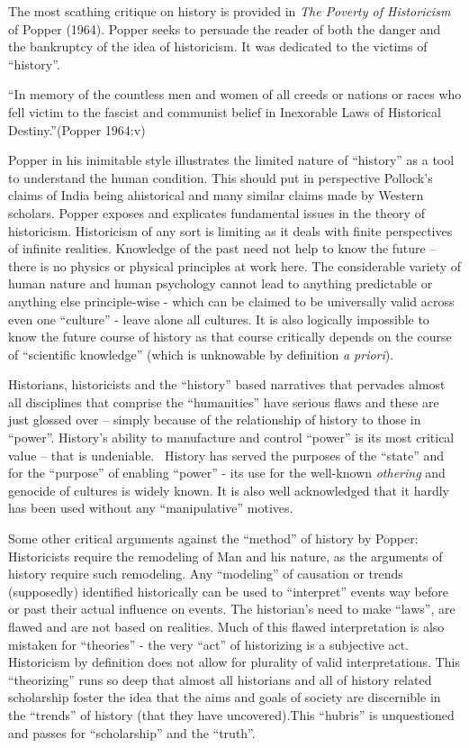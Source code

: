 The most scathing critique on history is provided in \textit{The Poverty of Historicism} of Popper (1964). Popper seeks to persuade the reader of both the danger and the bankruptcy of the idea of historicism. It was dedicated to the victims of “history”.

\begin{myquote}
“In memory of the countless men and women of all creeds or nations or races who fell victim to the fascist and communist belief in Inexorable Laws of Historical Destiny.”\hfill (Popper 1964:v)
\end{myquote}

Popper in his inimitable style illustrates the limited nature of “history” as a tool to understand the human condition. This should put in perspective Pollock’s claims of India being ahistorical and many similar claims made by Western scholars. Popper exposes and explicates fundamental issues in the theory of historicism. Historicism of any sort is limiting as it deals with finite perspectives of infinite realities. Knowledge of the past need not help to know the future – there is no physics or physical principles at work here. The considerable variety of human nature and human psychology cannot lead to anything predictable or anything else principle-wise - which can be claimed to be universally valid across even one “culture” - leave alone all cultures. It is also logically impossible to know the future course of history as that course critically depends on the course of “scientific knowledge” (which is unknowable by definition \textit{a priori}).

Historians, historicists and the “history” based narratives that pervades almost all disciplines that comprise the “humanities” have serious flaws and these are just glossed over – simply because of the relationship of history to those in “power”. History’s ability to manufacture and control “power” is its most critical value – that is undeniable.  History has served the purposes of the “state” and for the “purpose” of enabling “power” - its use for the well-known \textit{othering} and genocide of cultures is widely known. It is also well acknowledged that it hardly has been used without any “manipulative” motives.

Some other critical arguments against the “method” of history by Popper: Historicists require the remodeling of Man and his nature, as the arguments of history require such remodeling. Any “modeling” of causation or trends (supposedly) identified historically can be used to “interpret” events way before or past their actual influence on events. The historian’s need to make “laws”, are flawed and are not based on realities. Much of this flawed interpretation is also mistaken for “theories” - the very “act” of historizing is a subjective act. Historicism by definition does not allow for plurality of valid interpretations. This “theorizing” runs so deep that almost all historians and all of history related scholarship foster the idea that the aims and goals of society are discernible in the “trends” of history (that they have uncovered).This “hubris” is unquestioned and passes for “scholarship” and the “truth”.

